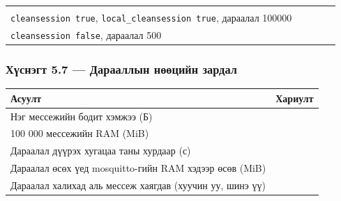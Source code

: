 \begin{longtable}[]{@{}lllll@{}}
\begin{minipage}[t]{0.17\columnwidth}
\strut
\end{minipage}\tabularnewline
\begin{minipage}[t]{0.17\columnwidth}\raggedright
\texttt{cleansession\ true}, \texttt{local\_\allowbreak{}cleansession\ true}, дараалал 100000\strut
\end{minipage} & \begin{minipage}[t]{0.17\columnwidth}\raggedright
\strut
\end{minipage} & \begin{minipage}[t]{0.17\columnwidth}\raggedright
\strut
\end{minipage} & \begin{minipage}[t]{0.17\columnwidth}\raggedright
\strut
\end{minipage} & \begin{minipage}[t]{0.17\columnwidth}\raggedright
\strut
\end{minipage}\tabularnewline
\begin{minipage}[t]{0.17\columnwidth}\raggedright
\texttt{cleansession\ false}, дараалал 500\strut
\end{minipage} & \begin{minipage}[t]{0.17\columnwidth}\raggedright
\strut
\end{minipage} & \begin{minipage}[t]{0.17\columnwidth}\raggedright
\strut
\end{minipage} & \begin{minipage}[t]{0.17\columnwidth}\raggedright
\strut
\end{minipage} & \begin{minipage}[t]{0.17\columnwidth}\raggedright
\strut
\end{minipage}\tabularnewline
\bottomrule
\end{longtable}\endgroup

\hypertarget{ux445ux4afux441ux43dux44dux433ux442-5.7-ux434ux430ux440ux430ux430ux43bux43bux44bux43d-ux43dux4e9ux4e9ux446ux438ux439ux43d-ux437ux430ux440ux434ux430ux43b}{%
\subsubsection{Хүснэгт 5.7 --- Дарааллын нөөцийн зардал}\label{ux445ux4afux441ux43dux44dux433ux442-5.7-ux434ux430ux440ux430ux430ux43bux43bux44bux43d-ux43dux4e9ux4e9ux446ux438ux439ux43d-ux437ux430ux440ux434ux430ux43b}}

\begingroup\scriptsize\begin{longtable}[]{@{}ll@{}}
\toprule
Асуулт & Хариулт\tabularnewline
\midrule
\endhead
Нэг мессежийн бодит хэмжээ (Б) &\tabularnewline
100 000 мессежийн RAM (MiB) &\tabularnewline
Дараалал дүүрэх хугацаа таны хурдаар (с) &\tabularnewline
Дараалал өсөх үед mosquitto-гийн RAM хэдээр өсөв (MiB) &\tabularnewline
Дараалал халихад аль мессеж хаягдав (хуучин уу, шинэ үү) &\tabularnewline
\bottomrule
\end{longtable}\endgroup

